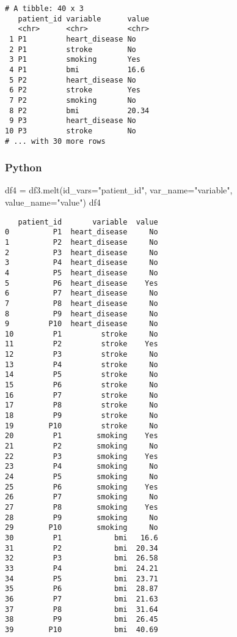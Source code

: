 \documentclass[
  letterpaper,
  DIV=11,
  numbers=noendperiod]{scrreprt}
\newenvironment{Shaded}{\begin{snugshade}}{\end{snugshade}}
\newcommand{\NormalTok}[1]{\textcolor[rgb]{0.00,0.46,0.62}{#1}}
\newcommand{\OperatorTok}[1]{\textcolor[rgb]{0.37,0.37,0.37}{#1}}
\newcommand{\StringTok}[1]{\textcolor[rgb]{0.13,0.47,0.30}{#1}}
\begin{document}
\begin{verbatim}
# A tibble: 40 x 3
   patient_id variable      value
   <chr>      <chr>         <chr>
 1 P1         heart_disease No   
 2 P1         stroke        No   
 3 P1         smoking       Yes  
 4 P1         bmi           16.6 
 5 P2         heart_disease No   
 6 P2         stroke        Yes  
 7 P2         smoking       No   
 8 P2         bmi           20.34
 9 P3         heart_disease No   
10 P3         stroke        No   
# ... with 30 more rows
\end{verbatim}

\hypertarget{python-31}{%
\subsubsection{Python}\label{python-31}}

\begin{Shaded}
\begin{Highlighting}[]
\NormalTok{df4 }\OperatorTok{=}\NormalTok{ df3.melt(id\_vars}\OperatorTok{=}\StringTok{"patient\_id"}\NormalTok{, var\_name}\OperatorTok{=}\StringTok{"variable"}\NormalTok{, value\_name}\OperatorTok{=}\StringTok{"value"}\NormalTok{)}
\NormalTok{df4}
\end{Highlighting}
\end{Shaded}

\begin{verbatim}
   patient_id       variable  value
0          P1  heart_disease     No
1          P2  heart_disease     No
2          P3  heart_disease     No
3          P4  heart_disease     No
4          P5  heart_disease     No
5          P6  heart_disease    Yes
6          P7  heart_disease     No
7          P8  heart_disease     No
8          P9  heart_disease     No
9         P10  heart_disease     No
10         P1         stroke     No
11         P2         stroke    Yes
12         P3         stroke     No
13         P4         stroke     No
14         P5         stroke     No
15         P6         stroke     No
16         P7         stroke     No
17         P8         stroke     No
18         P9         stroke     No
19        P10         stroke     No
20         P1        smoking    Yes
21         P2        smoking     No
22         P3        smoking    Yes
23         P4        smoking     No
24         P5        smoking     No
25         P6        smoking    Yes
26         P7        smoking     No
27         P8        smoking    Yes
28         P9        smoking     No
29        P10        smoking     No
30         P1            bmi   16.6
31         P2            bmi  20.34
32         P3            bmi  26.58
33         P4            bmi  24.21
34         P5            bmi  23.71
35         P6            bmi  28.87
36         P7            bmi  21.63
37         P8            bmi  31.64
38         P9            bmi  26.45
39        P10            bmi  40.69
\end{verbatim}
\end{document}

